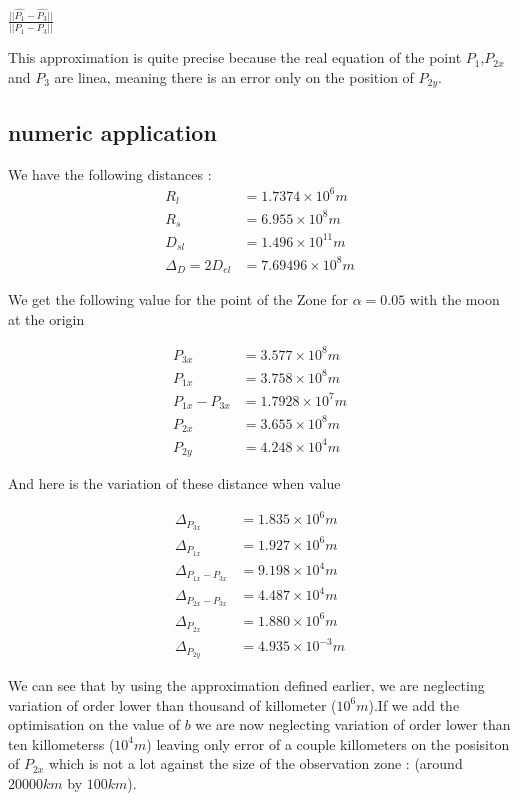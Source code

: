 \documentclass{article} %
\begin{document}
		
		$\frac{||\hat{P_1}-\hat{P_3}||}{||P_1-P_3||}$
		
		This approximation is quite precise because the real equation of the point $P_1$,$P_{2x}$ and $P_3$ are linea, meaning there is an error only on the position of $P_{2y}$.
		
		\subsection{numeric application}
		We have the following distances : 
		$$
		\begin{align}
			R_l&=1.7374\times10^6 m \\
			R_s&=6.955\times10^8 m \\ 
			D_{sl}&=1.496\times10^{11} m \\
			\Delta_D=2D_{el}&= 7.69496\times10^8 m
		\end{align}
		$$
		
		We get the following value for the point of the Zone for $\alpha=0.05$ with the moon at the origin
		
		$$
		\begin{align}
			P_{3x}&=3.577\times10^8 m \\
			P_{1x}&=3.758\times10^8 m \\ 
			P_{1x}-P_{3x}&=1.7928\times10^7 m \\ 
			P_{2x}&=3.655\times10^8 m \\
			P_{2y}&= 4.248\times10^4 m
		\end{align}
		$$
		
		And here is the variation of these distance when value 
		
		$$
		\begin{align}
			\Delta_{P_{3x}}&=1.835\times10^6 m \\
			\Delta_{P_{1x}}&=1.927\times10^6 m \\ 
			\Delta_{P_{1x}-P_{3x}}&=9.198\times10^4 m \\ 
			\Delta_{P_{2x}-P_{3x}}&=4.487\times10^4 m \\ 
			\Delta_{P_{2x}}&=1.880\times10^6 m \\
			\Delta_{P_{2y}}&= 4.935\times10^{-3} m
		\end{align}
		$$
		
		
		We can see that by using the approximation defined earlier, we are neglecting variation of order lower than thousand of killometer ($10^6 m$).If we add the optimisation on the value of $b$ we are now neglecting variation of order lower than ten killometerss ($10^4 m$) leaving only error of a couple killometers on the  posisiton of $P_{2x}$ which is not a lot against the size of the observation zone : (around $ 20000 km $ by $100 km$).
		
\end{document}
